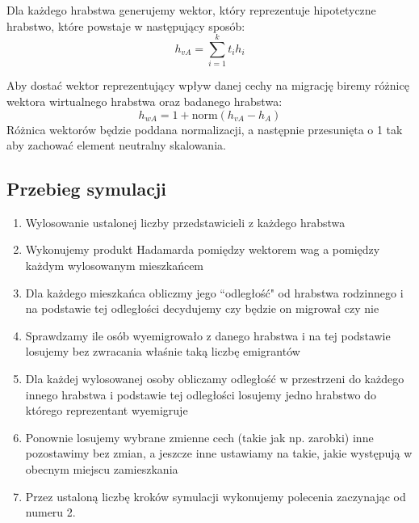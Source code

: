 \documentclass[a4paper,12pt]{article}
\begin{document}
Dla każdego hrabstwa generujemy wektor, który reprezentuje hipotetyczne hrabstwo, które powstaje w następujący sposób:
\begin{equation}
    h_{vA} = \sum_{i=1}^{k} t_i h_i
\end{equation}

Aby dostać wektor reprezentujący wpływ danej cechy na migrację biremy różnicę wektora wirtualnego hrabstwa oraz badanego hrabstwa:
\begin{equation}
    h_{wA} = 1 + \mathrm{norm}(h_{vA} - h_{A})
\end{equation}
Różnica wektorów będzie poddana normalizacji, a następnie przesunięta o 1 tak aby zachować element neutralny skalowania.

\subsection*{Przebieg symulacji}
\begin{enumerate}
    \item Wylosowanie ustalonej liczby przedstawicieli z każdego hrabstwa
    \item Wykonujemy produkt Hadamarda pomiędzy wektorem wag a pomiędzy każdym wylosowanym mieszkańcem
    \item Dla każdego mieszkańca obliczmy jego ``odległość" od hrabstwa rodzinnego i na podstawie tej odległości decydujemy czy będzie on migrował czy nie
    \item Sprawdzamy ile osób wyemigrowało z danego hrabstwa i na tej podstawie losujemy bez zwracania właśnie taką liczbę emigrantów
    \item Dla każdej wylosowanej osoby obliczamy odległość w przestrzeni do każdego innego hrabstwa i podstawie tej odległości losujemy jedno hrabstwo do którego reprezentant wyemigruje
    \item Ponownie losujemy wybrane zmienne cech (takie jak np. zarobki) inne pozostawimy bez zmian, a jeszcze inne ustawiamy na takie, jakie występują w obecnym miejscu zamieszkania
    \item Przez ustaloną liczbę kroków symulacji wykonujemy polecenia zaczynając od numeru 2.
\end{enumerate}

\newpage
\printbibliography[title=Bibliografia]
\end{document}

